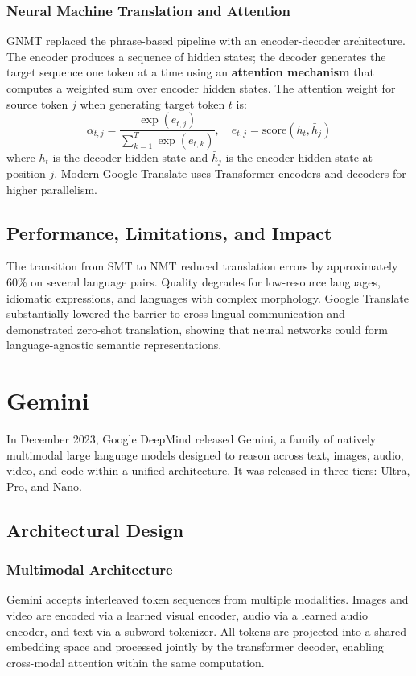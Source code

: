\documentclass[12pt,a4paper]{report}
\begin{document}
\subsubsection{Neural Machine Translation and Attention}
GNMT replaced the phrase-based pipeline with an encoder-decoder architecture. The encoder produces a sequence of hidden states; the decoder generates the target sequence one token at a time using an \textbf{attention mechanism} that computes a weighted sum over encoder hidden states. The attention weight for source token $j$ when generating target token $t$ is:
\[
\alpha_{t,j} = \frac{\exp(e_{t,j})}{\sum_{k=1}^{T} \exp(e_{t,k})}, \quad e_{t,j} = \text{score}(h_t, \bar{h}_j)
\]
where $h_t$ is the decoder hidden state and $\bar{h}_j$ is the encoder hidden state at position $j$. Modern Google Translate uses Transformer encoders and decoders for higher parallelism.

\subsection{Performance, Limitations, and Impact}
The transition from SMT to NMT reduced translation errors by approximately 60\% on several language pairs. Quality degrades for low-resource languages, idiomatic expressions, and languages with complex morphology. Google Translate substantially lowered the barrier to cross-lingual communication and demonstrated zero-shot translation, showing that neural networks could form language-agnostic semantic representations.

\section{Gemini}
In December 2023, Google DeepMind released Gemini, a family of natively multimodal large language models designed to reason across text, images, audio, video, and code within a unified architecture. It was released in three tiers: Ultra, Pro, and Nano.

\subsection{Architectural Design}

\subsubsection{Multimodal Architecture}
Gemini accepts interleaved token sequences from multiple modalities. Images and video are encoded via a learned visual encoder, audio via a learned audio encoder, and text via a subword tokenizer. All tokens are projected into a shared embedding space and processed jointly by the transformer decoder, enabling cross-modal attention within the same computation.
\end{document}
